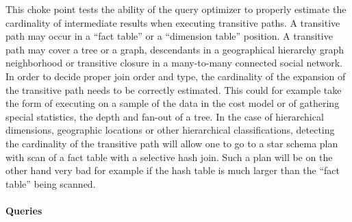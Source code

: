 
This choke point tests the ability of the query optimizer to properly estimate
the cardinality of intermediate results when executing transitive paths. A
transitive path may occur in a ``fact table'' or a ``dimension table'' position.
A transitive path may cover a tree or a graph, \eg descendants in a geographical
hierarchy \vs graph neighborhood or transitive closure in a many-to-many
connected social network. In order to decide proper join order and type, the
cardinality of the expansion of the transitive path needs to be correctly
estimated. This could for example take the form of executing on a sample of the
data in the cost model or of gathering special statistics, \eg the depth and
fan-out of a tree. In the case of hierarchical dimensions, \eg geographic
locations or other hierarchical classifications, detecting the cardinality of
the transitive path will allow one to go to a star schema plan with scan of a
fact table with a selective hash join. Such a plan will be on the other hand
very bad for example if the hash table is much larger than the ``fact table''
being scanned.


\paragraph{Queries}
{\raggedright
}